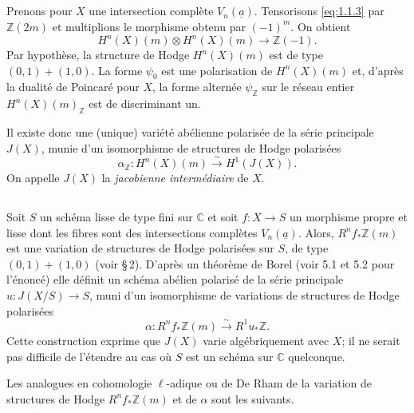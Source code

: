 \documentclass[10pt,leqno]{amsart}
\theoremstyle{plain}
\theoremstyle{definition}
\theoremstyle{remark}
\newcommand{\ZZ}{\mathbb{Z}}
\newcommand{\CC}{\mathbb{C}}
\newcommand{\ua}{\underline{a}}
\begin{document}
\subsection{}\label{1.4}

Prenons pour $X$ une intersection compl\`ete $V_n(\ua)$. Tensorisons \eqref{eq:1.1.3} par $\ZZ(2m)$ et multiplions le morphisme obtenu par $(-1)^m$. On obtient
\begin{equation}\label{eq:1.4.1}
H^n(X)(m)\otimes H^n(X)(m)\to\ZZ(-1).
\end{equation}
Par hypoth\`ese, la structure de Hodge $H^n(X)(m)$ est de type $(0,1)+(1,0)$. La forme $\psi_0$ est une polarisation de $H^n(X)(m)$ et, d'apr\`es la dualit\'e de Poincar\'e pour $X$, la forme altern\'ee $\psi_\ZZ$ sur le r\'eseau entier $H^n(X)(m)_\ZZ$ est de discriminant un.

Il existe donc une (unique) vari\'et\'e ab\'elienne polaris\'ee de la s\'erie principale $J(X)$, munie d'un isomorphisme de structures de Hodge polaris\'ees
\[
\alpha_\ZZ\colon H^n(X)(m)\xrightarrow{\sim} H^1(J(X)).
\]
On appelle $J(X)$ la \emph{jacobienne interm\'ediaire} de $X$.

\subsection{}\label{1.5}

Soit $S$ un sch\'ema lisse de type fini sur $\CC$ et soit $f\colon X\to S$ un morphisme propre et lisse dont les fibres sont des intersections compl\`etes $V_n(\ua)$. Alors, $R^nf_*\ZZ(m)$ est une variation de structures de Hodge polaris\'ees sur $S$, de type $(0,1)+(1,0)$ (voir \cite{5} \S\,2). D'apr\`es un th\'eor\`eme de Borel (voir \cite{4} 5.1 et 5.2 pour l'\'enonc\'e) elle d\'efinit un sch\'ema ab\'elien polaris\'e de la s\'erie principale $u\colon J(X/S)\to S$, muni d'un isomorphisme de variations de structures de Hodge polaris\'ees
\[
\alpha\colon R^nf_*\ZZ(m)\xrightarrow{\sim} R^1u_*\ZZ.
\]
Cette construction exprime que $J(X)$ varie alg\'ebriquement avec $X$; il ne serait pas difficile de l'\'etendre au cas o\`u $S$ est un sch\'ema sur $\CC$ quelconque.

Les analogues en cohomologie $\ell$-adique ou de De Rham de la variation de structures de Hodge $R^nf_*\ZZ(m)$ et de $\alpha$ sont les suivants.

\subsection{}\label{1.6}
\end{document}
